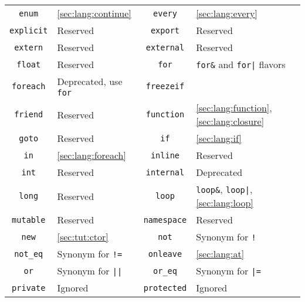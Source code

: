 \begin{tabular}{|c|l||c|l|}
    \lstinline"enum" & \autoref{sec:lang:continue}              &
   \lstinline"every" & \autoref{sec:lang:every}                 \\
\lstinline"explicit" & Reserved                                 &
  \lstinline"export" & Reserved                                 \\
  \lstinline"extern" & Reserved                                 &
\lstinline"external" & Reserved                                 \\
   \lstinline"float" & Reserved                                 &
     \lstinline"for" & \lstinline|for&| and \lstinline-for|- flavors \\
 \lstinline"foreach" & Deprecated, use \lstinline|for|          &
\lstinline"freezeif" &                                          \\
  \lstinline"friend" & Reserved                                 &
\lstinline"function" & \autoref{sec:lang:function}, \autoref{sec:lang:closure} \\
    \lstinline"goto" & Reserved                                 &
      \lstinline"if" & \autoref{sec:lang:if}                    \\
      \lstinline"in" & \autoref{sec:lang:foreach}               &
  \lstinline"inline" & Reserved                                 \\
     \lstinline"int" & Reserved                                 &
\lstinline"internal" & Deprecated                               \\
    \lstinline"long" & Reserved                                 &
    \lstinline"loop" & \lstinline|loop&|, \lstinline-loop|-, \autoref{sec:lang:loop} \\
 \lstinline"mutable" & Reserved                                 &
\lstinline"namespace" & Reserved                                 \\
     \lstinline"new" & \autoref{sec:tut:ctor}                   &
     \lstinline"not" & Synonym for \lstinline|!|                \\
  \lstinline"not_eq" & Synonym for \lstinline|!=|               &
 \lstinline"onleave" & \autoref{sec:lang:at}                    \\
      \lstinline"or" & Synonym for \lstinline-||-               &
   \lstinline"or_eq" & Synonym for \lstinline-|=-               \\
 \lstinline"private" & Ignored                                  &
\lstinline"protected" & Ignored                                  \\

\end{tabular}
